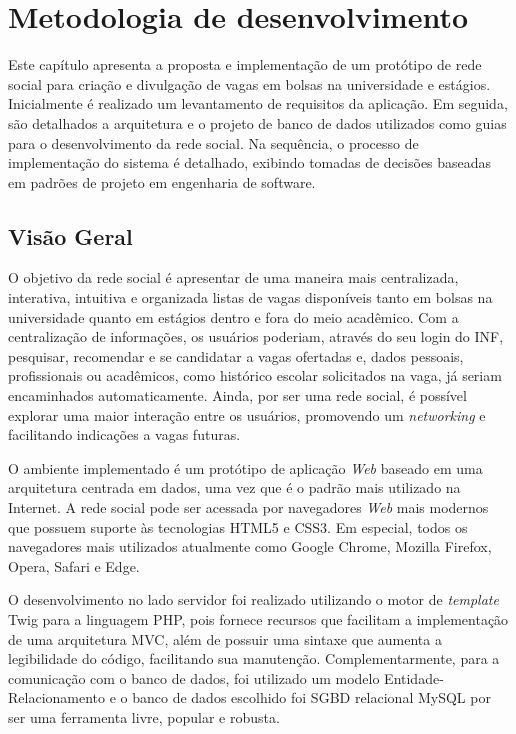 \chapter{Metodologia de desenvolvimento}
\label{metodologiaDesenvolvimento}
Este capítulo apresenta a proposta e implementação de um protótipo de rede social para criação e divulgação de vagas em bolsas na universidade e estágios. Inicialmente é realizado um levantamento de requisitos da aplicação. Em seguida, são detalhados a arquitetura e o projeto de banco de dados utilizados como guias para o desenvolvimento da rede social. Na sequência, o processo de implementação do sistema é detalhado, exibindo tomadas de decisões baseadas em padrões de projeto em engenharia de software.

\section{Visão Geral}
\label{metodologiaVisaoGeral}
O objetivo da rede social é apresentar de uma maneira mais centralizada, interativa, intuitiva e organizada listas de vagas disponíveis tanto em bolsas na universidade quanto em estágios dentro e fora do meio acadêmico. Com a centralização de informações, os usuários poderiam, através do seu login do INF, pesquisar, recomendar e se candidatar a vagas ofertadas e, dados pessoais, profissionais ou acadêmicos, como histórico escolar solicitados na vaga, já seriam encaminhados automaticamente. Ainda, por ser uma rede social, é possível explorar uma maior interação entre os usuários, promovendo um \textit{networking} e facilitando indicações a vagas futuras.

O ambiente implementado é um protótipo de aplicação \textit{Web} baseado em uma arquitetura centrada em dados, uma vez que é o padrão mais utilizado na Internet. A rede social pode ser acessada por navegadores \textit{Web} mais modernos que possuem suporte às tecnologias HTML5 e CSS3. Em especial, todos os navegadores mais utilizados atualmente como Google Chrome, Mozilla Firefox, Opera, Safari e Edge.

O desenvolvimento no lado servidor foi realizado utilizando o motor de \textit{template} Twig para a linguagem PHP, pois fornece recursos que facilitam a implementação de uma arquitetura MVC, além de possuir uma sintaxe que aumenta a legibilidade do código, facilitando sua manutenção. Complementarmente, para a comunicação com o banco de dados, foi utilizado um modelo Entidade-Relacionamento e o banco de dados escolhido foi SGBD relacional MySQL por ser uma ferramenta livre, popular e robusta.

